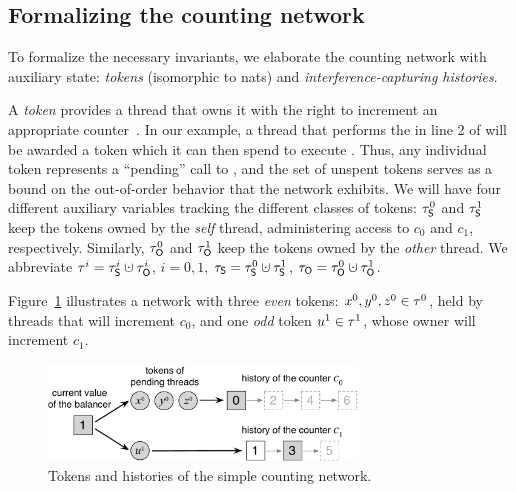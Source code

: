 
\subsection{Formalizing the counting network}
\label{sec:counting-intuition}

To formalize the necessary invariants, we elaborate the counting
network with auxiliary state: \emph{tokens} (isomorphic to nats) and
\emph{interference-capturing histories}.

A \emph{token} provides a thread that owns it with the right to
increment an appropriate counter~\cite{Aspnes-al:JACM94}. In our
example, a thread that performs the  in line 2 of
 will be awarded a token which it can then spend to
execute .
%
Thus, any individual token represents a ``pending'' call to
, and the set of unspent tokens serves as a bound on
the out-of-order behavior that the network exhibits. We will have four
different auxiliary variables tracking the different classes of
tokens: $\tau_{\mathsf{S}}^0$ and $\tau_{\mathsf{S}}^1$ keep the tokens owned by the
\emph{self} thread, administering access to $c_0$ and $c_1$,
respectively. Similarly, $\tau_{\mathsf{O}}^0$ and $\tau_{\mathsf{O}}^1$ keep the tokens owned
by the \emph{other} thread. We abbreviate $\tkn^i = \tkns^i \hunion
\tkno^i$, $i=0,1$, $\tkns = \tkns^0 \hunion \tkns^1$, $\tkno = \tkno^0
\hunion \tkno^1$.

Figure~\ref{fig:chist} illustrates a network with three \emph{even}
tokens: $x^0, y^0, z^0 \in \tau^0$, held by threads that will
increment $c_0$, and one \emph{odd} token $u^1 \in \tau^1$, whose
owner will increment $c_1$.
%

\begin{figure}
\centering
\includegraphics[width=8.2cm]{chist.pdf}      
\caption{Tokens and histories of the simple counting network.}
\label{fig:chist}
\end{figure}

